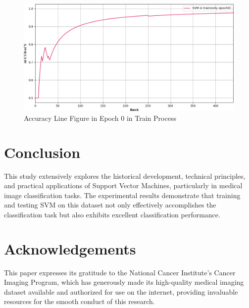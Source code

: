 \documentclass[twocolumn]{article}
\begin{document}
\begin{figure}[h]
	\centering
	\includegraphics[width=1.0\linewidth]{exp_log/train440_valid024/ACCURACY_train_epoch0}
	\caption[acc_train_e0]{Accuracy Line Figure in Epoch 0 in Train Process}
	\label{fig:acc_train_e0}
\end{figure}

\section{Conclusion}
This study extensively explores the historical development, technical principles, and practical applications of Support Vector Machines, particularly in medical image classification tasks. The experimental results demonstrate that training and testing SVM on this dataset not only effectively accomplishes the classification task but also exhibits excellent classification performance.

\section*{Acknowledgements}
This paper expresses its gratitude to the National Cancer Institute's Cancer Imaging Program, which has generously made its high-quality medical imaging dataset available and authorized for use on the internet, providing invaluable resources for the smooth conduct of this research.




\end{document}
